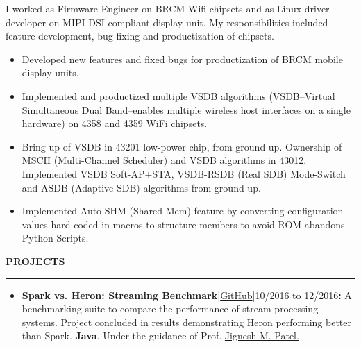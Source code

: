 \documentclass[a4paper, 10pt]{extarticle}
\begin{document}
\begin{large}
I worked as Firmware Engineer on BRCM Wifi chipsets and as Linux driver
developer on MIPI-DSI compliant display unit. My responsibilities included
feature development, bug fixing and productization  of chipsets.
\vspace{-0.1cm}
\begin{itemize}
    \item{Developed new features and fixed bugs for productization  of BRCM
mobile display units.}
    \vspace{-.2cm}
    \item{Implemented and productized multiple VSDB algorithms (VSDB--Virtual
Simultaneous Dual Band--enables multiple wireless host interfaces on a single
hardware) on 4358 and 4359 WiFi chipsets.}
    \vspace{-.2cm}
    \item{Bring up of VSDB in 43201 low-power chip, from ground up.  Ownership
of MSCH (Multi-Channel Scheduler) and VSDB algorithms in 43012. Implemented VSDB
Soft-AP+STA, VSDB-RSDB (Real SDB) Mode-Switch and ASDB (Adaptive SDB) algorithms
from ground up.}
    \vspace{-.2cm}
    \item{Implemented Auto-SHM (Shared Mem) feature by converting configuration
values hard-coded in macros to structure members to avoid ROM abandons. Python
Scripts.}
    \vspace{-0.2cm}
\end{itemize}

\vspace{.2cm}
\begin{flushleft}
{\LARGE{\textbf{P}}\Large{\textbf{ROJECTS}}}
\end{flushleft}
\vspace{-0.2cm}\hrule %

\begin{itemize}
    \item{\textbf{Spark vs. Heron: Streaming
Benchmark}|\href{https://github.com/rdamkondwar/Streaming-Benchmark}{GitHub}|10/2016
to 12/2016\textbf{{\Large{:}}} A benchmarking suite to compare the performance
of  stream processing systems. Project concluded in results demonstrating Heron
performing better than Spark. \textbf{Java}. Under the guidance of Prof.
\href{http://pages.cs.wisc.edu/~jignesh/}{Jignesh M. Patel.}}
    \vspace{-.1cm}
    

\end{itemize}
\end{large}
\end{document}
